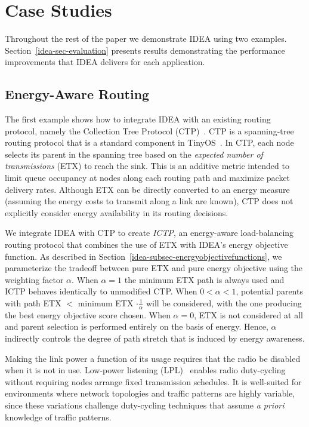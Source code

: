 \section{Case Studies}
\label{idea-sec-casestudies}

Throughout the rest of the paper we demonstrate IDEA using two examples.
Section~\ref{idea-sec-evaluation} presents results demonstrating the
performance improvements that IDEA delivers for each application.

\subsection{Energy-Aware Routing}

The first example shows how to integrate IDEA with an existing routing
protocol, namely the Collection Tree Protocol (CTP)~\cite{ctp-sensys09}. CTP
is a spanning-tree routing protocol that is a standard component in
TinyOS~\cite{tinyos-asplos00}. In CTP, each node selects its parent in the
spanning tree based on the \textit{expected number of transmissions} (ETX) to
reach the sink. This is an additive metric intended to limit queue occupancy
at nodes along each routing path and maximize packet delivery rates. Although
ETX can be directly converted to an energy measure (assuming the energy costs
to transmit along a link are known), CTP does not explicitly consider energy
availability in its routing decisions.

We integrate IDEA with CTP to create \textit{ICTP}, an energy-aware
load-balancing routing protocol that combines the use of ETX with IDEA's
energy objective function. As described in
Section~\ref{idea-subsec-energyobjectivefunctions}, we parameterize the
tradeoff between pure ETX and pure energy objective using the weighting
factor $\alpha$. When $\alpha = 1$ the minimum ETX path is always used and
ICTP behaves identically to unmodified CTP. When $0 < \alpha < 1$, potential
parents with path ETX $<$ minimum ETX $\cdot \frac{1}{\alpha}$ will be
considered, with the one producing the best energy objective score chosen.
When $\alpha = 0$, ETX is not considered at all and parent selection is
performed entirely on the basis of energy. Hence, $\alpha$ indirectly
controls the degree of path stretch that is induced by energy awareness. 

Making the link power a function of its usage requires that the radio be
disabled when it is not in use. Low-power listening (LPL)~\cite{tinyos-lpl}
enables radio duty-cycling without requiring nodes arrange fixed transmission
schedules. It is well-suited for environments where network topologies and
traffic patterns are highly variable, since these variations challenge
duty-cycling techniques that assume \textit{a priori} knowledge of traffic
patterns.

